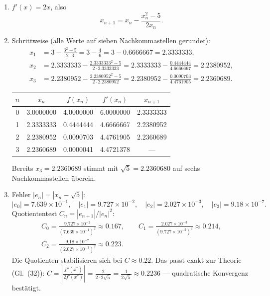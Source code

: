 \documentclass[a4paper,11pt]{scrartcl}
\begin{document}
\begin{enumerate}[label=(\alph*)]
  \item $f'(x) = 2x$, also
  \[ x_{n+1} = x_n - \frac{x_n^2 - 5}{2 x_n}. \]
  \item Schrittweise (alle Werte auf sieben Nachkommastellen gerundet):
  \begin{align*}
    x_1 &= 3 - \frac{3^2 - 5}{2 \cdot 3} = 3 - \frac{4}{6} = 3 - 0.6666667 = 2.3333333,\\[2pt]
    x_2 &= 2.3333333 - \frac{2.3333333^2 - 5}{2 \cdot 2.3333333}
         = 2.3333333 - \frac{0.4444444}{4.6666667} = 2.2380952,\\[2pt]
    x_3 &= 2.2380952 - \frac{2.2380952^2 - 5}{2 \cdot 2.2380952}
         = 2.2380952 - \frac{0.0090703}{4.4761905} = 2.2360689.
  \end{align*}
  \begin{center}
  \begin{tabular}{ccccc}
    \toprule
    $n$ & $x_n$ & $f(x_n)$ & $f'(x_n)$ & $x_{n+1}$\\
    \midrule
    0 & 3.0000000 & 4.0000000 & 6.0000000 & 2.3333333\\
    1 & 2.3333333 & 0.4444444 & 4.6666667 & 2.2380952\\
    2 & 2.2380952 & 0.0090703 & 4.4761905 & 2.2360689\\
    3 & 2.2360689 & 0.0000041 & 4.4721378 & ---\\
    \bottomrule
  \end{tabular}
  \end{center}
  Bereits $x_3 = 2.2360689$ stimmt mit $\sqrt{5} = 2.2360680$ auf sechs
  Nachkommastellen überein.
  \item Fehler $|e_n| = |x_n - \sqrt{5}|$:
  \[ |e_0| = 7.639 \times 10^{-1}, \quad |e_1| = 9.727 \times 10^{-2}, \quad
     |e_2| = 2.027 \times 10^{-3}, \quad |e_3| = 9.18 \times 10^{-7}. \]
  Quotiententest $C_n = |e_{n+1}| / |e_n|^2$:
  \begin{gather*}
    C_0 = \frac{9.727 \times 10^{-2}}{(7.639 \times 10^{-1})^2} \approx 0.167, \qquad
    C_1 = \frac{2.027 \times 10^{-3}}{(9.727 \times 10^{-2})^2} \approx 0.214,\\
    C_2 = \frac{9.18 \times 10^{-7}}{(2.027 \times 10^{-3})^2} \approx 0.223.
  \end{gather*}
  Die Quotienten stabilisieren sich bei $C \approx 0.22$. Das passt exakt zur Theorie
  (Gl.~(32)): $C = \left|\frac{f''(x^*)}{2 f'(x^*)}\right| = \frac{2}{2 \cdot 2\sqrt{5}}
  = \frac{1}{2\sqrt{5}} \approx 0.2236$ --- quadratische Konvergenz bestätigt.
\end{enumerate}
\end{document}
